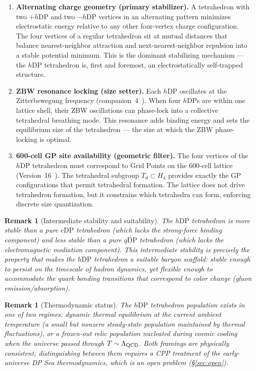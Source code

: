 \documentclass[12pt]{article}
\newtheorem{remark}[theorem]{Remark}
\newcommand{\eDP}{e\mathrm{DP}}
\newcommand{\qDP}{q\mathrm{DP}}
\newcommand{\hDP}{h\mathrm{DP}}
\begin{document}
\begin{enumerate}
\item \textbf{Alternating charge geometry (primary stabilizer).}
  A tetrahedron with two $+\hDP$ and two $-\hDP$ vertices in an
  alternating pattern minimizes electrostatic energy relative to
  any other four-vertex charge configuration.  The four vertices
  of a regular tetrahedron sit at mutual distances that balance
  nearest-neighbor attraction and next-nearest-neighbor repulsion
  into a stable potential minimum.  This is the dominant
  stabilizing mechanism --- the $\hDP$ tetrahedron is, first and
  foremost, an electrostatically self-trapped structure.

\item \textbf{ZBW resonance locking (size setter).}
  Each $\hDP$ oscillates at the Zitterbewegung frequency
  (companion~4~\cite{c4}).  When four $\hDP$s are within one
  lattice shell, their ZBW oscillations can phase-lock into a
  collective tetrahedral breathing mode.  This resonance adds
  binding energy and sets the equilibrium size of the tetrahedron
  --- the size at which the ZBW phase-locking is optimal.

\item \textbf{600-cell GP site availability (geometric filter).}
  The four vertices of the $\hDP$ tetrahedron must correspond to
  Grid Points on the 600-cell lattice (Version~16~\cite{v16}).
  The tetrahedral subgroup $T_d \subset H_4$ provides exactly the
  GP configurations that permit tetrahedral formation.  The lattice
  does not drive tetrahedron formation, but it constrains which
  tetrahedra can form, enforcing discrete size quantization.
\end{enumerate}

\begin{remark}[Intermediate stability and suitability]
The $\hDP$ tetrahedron is more stable than a pure $\eDP$ tetrahedron
(which lacks the strong-force binding component) and less stable than
a pure $\qDP$ tetrahedron (which lacks the electromagnetic mediation
component).  This intermediate stability is precisely the property
that makes the $\hDP$ tetrahedron a suitable baryon scaffold: stable
enough to persist on the timescale of hadron dynamics, yet flexible
enough to accommodate the quark bonding transitions that correspond
to color change (gluon emission/absorption).
\end{remark}

\begin{remark}[Thermodynamic status]
The $\hDP$ tetrahedron population exists in one of two regimes: 
dynamic thermal equilibrium at the current ambient temperature 
(a small but nonzero steady-state population maintained by thermal 
fluctuations), or a frozen-out relic population nucleated during 
cosmic cooling when the universe passed through $T \sim \Lambda_{\rm QCD}$.  
Both framings are physically consistent; distinguishing between them 
requires a CPP treatment of the early-universe DP Sea thermodynamics, 
which is an open problem (§\ref{sec:open}).
\end{remark}
\end{document}
